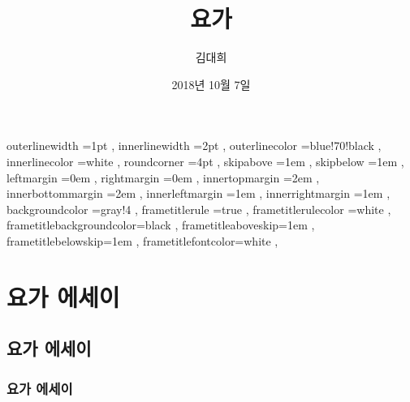\documentclass[12pt, a4paper, oneside]{book}
\let\stdsection\section
\renewcommand\section{\newpage\stdsection}
\begin{document}
	




			\title{요가}
			\author{김대희}
			\date{2018년 10월 7일}
			\maketitle


			\dominitoc
			\doparttoc[0]			

			\tableofcontents 		%
			\cleardoublepage
			\listoffigures 			%
			\cleardoublepage
			\listoftables 			%





		 {
						outerlinewidth		=1pt			,%
						innerlinewidth		=2pt			,%
						outerlinecolor		=blue!70!black	,%
						innerlinecolor		=white 			,%
						roundcorner			=4pt			,%
						skipabove			=1em 			,%
						skipbelow			=1em 			,%
						leftmargin			=0em			,%
						rightmargin			=0em			,%
						innertopmargin		=2em 			,%
						innerbottommargin 	=2em 			,%
						innerleftmargin		=1em 			,%
						innerrightmargin		=1em 			,%
						backgroundcolor		=gray!4			,%
						frametitlerule		=true 			,%
						frametitlerulecolor	=white			,%
						frametitlebackgroundcolor=black		,%
						frametitleaboveskip=1em 			,%
						frametitlebelowskip=1em 			,%
						frametitlefontcolor=white 			,%
						}


	




	\part{요가 에세이}
	\noptcrule
	\parttoc				


	\chapter{요가 에세이}
	\minitoc%



	\section{요가 에세이}
\end{document}

